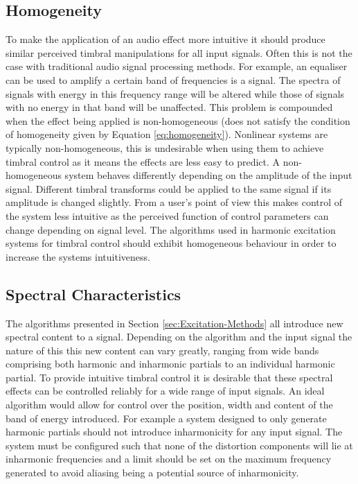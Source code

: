 	\subsection{Homogeneity}
	\label{sec:ExcitationEvaluation-Evaluation-Homogeneity}
		To make the application of an audio effect more intuitive it should produce similar perceived timbral
		manipulations for all input signals. Often this is not the case with traditional audio signal processing
		methods. For example, an equaliser can be used to amplify a certain band of frequencies is a signal. The
		spectra of signals with energy in this frequency range will be altered while those of signals with no
		energy in that band will be unaffected. This problem is compounded when the effect being applied is
		non-homogeneous (does not satisfy the condition of homogeneity given by Equation \ref{eq:homogeneity}).
		Nonlinear systems are typically non-homogeneous, this is undesirable when using them to achieve timbral
		control as it means the effects are less easy to predict. A non-homogeneous system behaves differently
		depending on the amplitude of the input signal. Different timbral transforms could be applied to the same
		signal if its amplitude is changed slightly. From a user's point of view this makes control of the system
		less intuitive as the perceived function of control parameters can change depending on signal level. The
		algorithms used in harmonic excitation systems for timbral control should exhibit homogeneous behaviour in
		order to increase the systems intuitiveness.

	\subsection{Spectral Characteristics}
	\label{sec:ExcitationEvaluation-Evaluation-SpectralCharacteristics}
		The algorithms presented in Section \ref{sec:Excitation-Methods} all introduce new spectral content to a
		signal. Depending on the algorithm and the input signal the nature of this this new content can vary
		greatly, ranging from wide bands comprising both harmonic and inharmonic partials to an individual harmonic
		partial. To provide intuitive timbral control it is desirable that these spectral effects can be controlled
		reliably for a wide range of input signals. An ideal algorithm would allow for control over the position,
		width and content of the band of energy introduced. For example a system designed to only generate harmonic
		partials should not introduce inharmonicity for any input signal. The system must be configured such that
		none of the distortion components will lie at inharmonic frequencies and a limit should be set on the
		maximum frequency generated to avoid aliasing being a potential source of inharmonicity.

